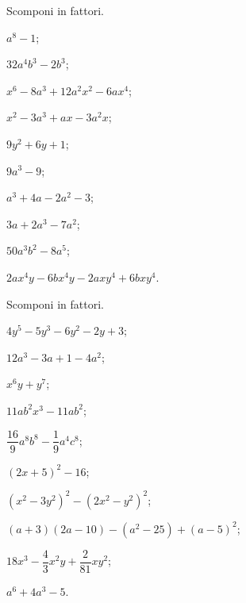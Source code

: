 \begin{esercizio}
 \label{ese:13.102}
 Scomponi in fattori.
\begin{multicols}{2}
 \begin{enumeratea}
\item $a^{{8}}-1$;
\item $32a^{4}b^{3} - 2b^{3}$;
\item $x^{6} - 8a^{3} + 12a^{2}x^{2} - 6ax^{4}$;
\item $x^{2} - 3a^{3} + ax - 3a^{2}x$;
\item $9y^{2}+6y+1$;
\item $9a^{3}-9$;
\item $a^{3}+4a-2a^{2}-3$;
\item $3a+2a^{3}-7a^{2}$;
\item $50a^{3}b^{2}-8a^{5}$;
\item $2ax^{4}y-6bx^{4}y-2axy^{4}+6bxy^{4}$.
 \end{enumeratea}
\end{multicols}
\end{esercizio}

\begin{esercizio}[\Ast]
 \label{ese:13.103}
 Scomponi in fattori.
 \begin{multicols}{2}
 \begin{enumeratea}
\item $4y^{5}-5y^{3}-6y^{2}-2y+3$;
\item $12a^{3}-3a+1-4a^{2}$;
\item $x^{6}y+y^{7}$;
\item $11ab^{2}x^{3}-11ab^{2}$;
\item $\dfrac{16}{9}a^{8}b^{8}-\dfrac{1}{9}a^{4}c^{8}$;
\item $(2x+5)^{2}-16$;
\item $\left(x^{2}-3y^{2}\right)^{2}-\left(2x^{2}-y^{2}\right)^{2}$;
\item $(a+3)(2a-10)-\left(a^{2}-25\right)+(a-5)^2$;
\item $18x^{3}-\dfrac{4}{3}x^{2}y+\dfrac{2}{81}xy^{2}$;
\item $a^{6}+4a^{3}-5$.
 \end{enumeratea}
 \end{multicols}
\end{esercizio}

